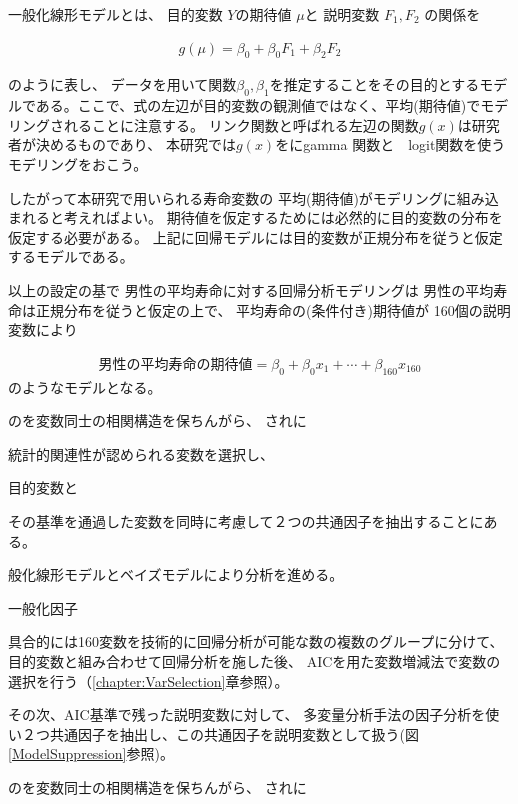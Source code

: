 \documentclass[a4j,11pt,mc]{jreport}
\begin{document}
一般化線形モデルとは、
目的変数
$Y$の期待値
$\mu$と
説明変数
$F_1, F_2$
の関係を

\begin{eqnarray}
g(\mu)=\beta_0 +\beta_0F_1 + \beta_2 F_2
\end{eqnarray}


のように表し、
データを用いて関数$\beta_0 ,\beta_1 $を推定することをその目的とするモデルである。ここで、式の左辺が目的変数の観測値ではなく、平均(期待値)でモデリングされることに注意する。
リンク関数と呼ばれる左辺の関数$g(x)$は研究者が決めるものであり、
本研究では$g(x)$をにgamma 関数と　logit関数を使うモデリングをおこう。

したがって本研究で用いられる寿命変数の
平均(期待値)がモデリングに組み込まれると考えればよい。
期待値を仮定するためには必然的に目的変数の分布を仮定する必要がある。
上記に回帰モデルには目的変数が正規分布を従うと仮定するモデルである。

以上の設定の基で
男性の平均寿命に対する回帰分析モデリングは
男性の平均寿命は正規分布を従うと仮定の上で、
平均寿命の(条件付き)期待値が
160個の説明変数により

\begin{eqnarray}
\mbox{男性の平均寿命の期待値}=
\beta_0 +\beta_0x_1 +\cdots + \beta_{160} x_{160}
\end{eqnarray}
のようなモデルとなる。



のを変数同士の相関構造を保ちんがら、
されに

統計的関連性が認められる変数を選択し、


目的変数と





その基準を通過した変数を同時に考慮して２つの共通因子を抽出することにある。


般化線形モデルとベイズモデルにより分析を進める。

一般化因子


具合的には160変数を技術的に回帰分析が可能な数の複数のグループに分けて、
目的変数と組み合わせて回帰分析を施した後、
AICを用た変数増減法で変数の選択を行う（\ref{chapter:VarSelection}章参照）。


その次、AIC基準で残った説明変数に対して、
多変量分析手法の因子分析を使い２つ共通因子を抽出し、この共通因子を説明変数として扱う(図\ref{ModelSuppression}参照)。






のを変数同士の相関構造を保ちんがら、
されに
\end{document}
